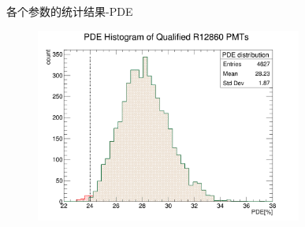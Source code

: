 \documentclass[11pt,compress,xcolor=x11names,UTF8]{beamer}
\begin{document}
\begin{frame}{各个参数的统计结果-PDE}
\begin{figure}
\centering
\includegraphics[width=0.78\textwidth]{figures/pde.png}
\end{figure}
\end{frame}
\end{document}
